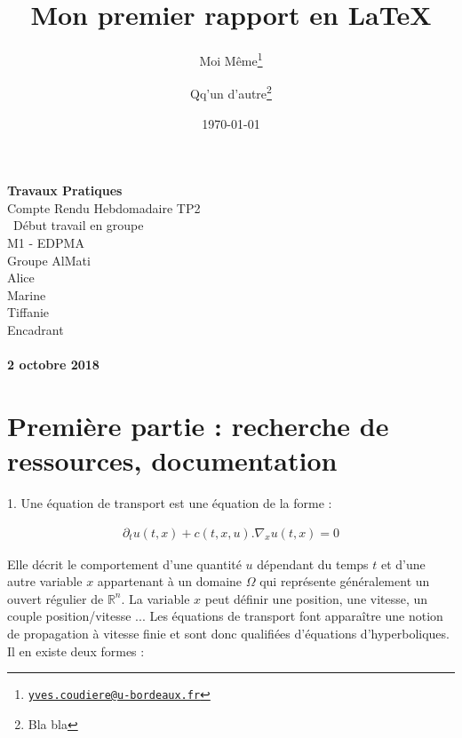 \documentclass[12pt]{article}
\title{Mon premier rapport en \LaTeX}
\author{
  Moi Même\thanks{\href{mailto:yves.coudiere@u-bordeaux.fr}{\tt yves.coudiere@u-bordeaux.fr}}
  \and
  Qq'un d'autre\thanks{Bla bla}
}
\date{\today} %
\begin{document}
\begin{titlepage}
\begin{center}


\vspace{3cm}

\huge
\textbf{Travaux Pratiques} \\
\vspace{0.7cm}
\Large
Compte Rendu Hebdomadaire TP2\\
\ Début travail en groupe \\
\large
\vspace{0.7cm}
M1 - EDPMA\\
Groupe AlMati\\
\vspace{0.7cm}
Alice  \\ Marine  \\ Tiffanie  \\
\vspace{0.7cm}
Encadrant\\
\\
\vspace{2cm}
\Large
\textbf{2 octobre 2018}
\end{center}
\end{titlepage}

\normalsize

\newpage


\section{Première partie : recherche de ressources, documentation}

1. Une équation de transport est une équation de la forme :

\begin{eqnarray}
\partial_tu(t,x)+c(t,x,u).\nabla_xu(t,x)=0
\end{eqnarray}

Elle décrit le comportement d'une quantité $u$ dépendant du temps $t$ et d'une autre variable $x$ appartenant à un domaine $\Omega$ qui représente généralement un ouvert régulier de $\mathbb{R}^n$. La variable $x$ peut définir une position, une vitesse, un couple position/vitesse ... Les équations de transport font apparaître une notion de propagation à vitesse finie et sont donc qualifiées d'équations d'hyperboliques.
\\Il en existe deux formes : 
\end{document}
